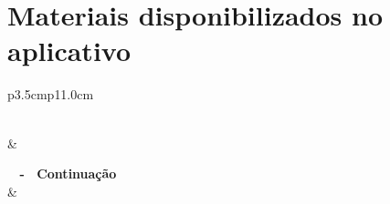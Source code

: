 \begin{apendicesenv}

\partapendices



\appendix
\begin{landscape}

\end{landscape}

\chapter{Materiais disponibilizados no aplicativo}
\label{chap:tabela_2}
\begin{longtable}{p{3.5cm}p{11.0cm}}

\caption[\textbf{Materiais disponibilizados no aplicativo}]{\textbf{Conteúdos difundidos pelo aplicativo empreenda agro sustentável}} 
\label{tabela_2} \\

\hline \hline {} & \\ \hline 

\endfirsthead

%

{{ \bfseries \tablename \ \thetable{} - \ \textbf{Continuação}}}\\

    \hline {} &   \\ \hline 

\endhead

\hline {} \\ \hline

\endfoot
\hline {} \\ \hline

\endfoot
\hline {} \\ \hline
\hline \hline


\end{longtable}
\end{apendicesenv}
